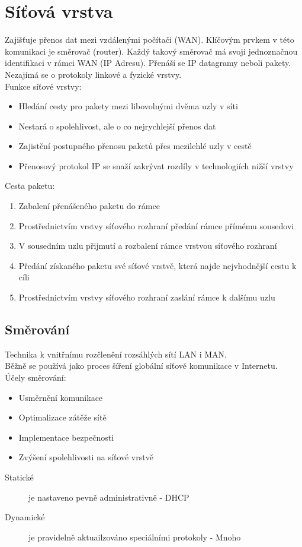 \section{Síťová vrstva}
  Zajišťuje přenos dat mezi vzdálenými počítači (WAN).
  Klíčovým prvkem v této komunikaci je směrovač (router).
  Každý takový směrovač má svoji jednoznačnou identifikaci v rámci WAN (IP Adresu).
  Přenáší se IP datagramy neboli pakety. Nezajímá se o protokoly linkové a fyzické vrstvy.\\
  Funkce síťové vrstvy:
  \begin{itemize}
    \item Hledání cesty pro pakety mezi libovolnými dvěma uzly v síti
    \item Nestará o spolehlivost, ale o co nejrychlejší přenos dat
    \item Zajistění postupného přenosu paketů přes mezilehlé uzly v cestě
    \item Přenosový protokol IP se snaží zakrývat rozdíly v technologiích nižší vrstvy
  \end{itemize}
  Cesta paketu:
  \begin{enumerate}
    \item Zabalení přenášeného paketu do rámce
    \item Prostřednictvím vrstvy síťového rozhraní předání rámce přímému sousedovi
    \item V sousedním uzlu přijmutí a rozbalení rámce vrstvou síťového rozhraní
    \item Předání získaného paketu své síťové vrstvě, která najde nejvhodnější cestu k cíli
    \item Prostřednictvím vrstvy síťového rozhraní zaslání rámce k dalšímu uzlu
  \end{enumerate}
  \subsection{Směrování}
    Technika k vnitřnímu rozčlenění rozsáhlých sítí LAN i MAN.\\
    Běžně se používá jako proces šíření globální síťové komunikace v Internetu.\\
    Účely směrování:
    \begin{itemize}
      \item Usměrnění komunikace
      \item Optimalizace zátěže sítě
      \item Implementace bezpečnosti
      \item Zvýšení spolehlivosti na síťové vrstvě
    \end{itemize}
    \begin{description}
      \item[Statické]je nastaveno pevně administrativně - DHCP
      \item[Dynamické]je pravidelně aktuailzováno speciálními protokoly - Mnoho
    \end{description}
